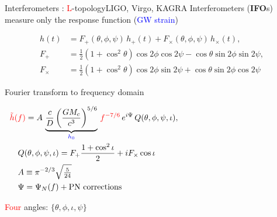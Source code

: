 \documentclass[xcolor=dvipsnames,handout,t]{beamer}
\newcommand{\red}[1]{\textcolor{red}{#1}}
\newcommand{\bl}[1]{\textcolor{blue}{#1}}
\newcommand{\f}{\frac}
\begin{document}
\begin{frame}{Interferometers : \red{L}-topology}{LIGO, Virgo, KAGRA}
  \vspace{-2mm}
  Interferometers ({\bf IFO}s) measure only the response function (\bl{GW strain})
  \begin{footnotesize}
  \begin{align*}
   h(t) &= F_+(\theta,\phi,\psi) \,h_+(t)+F_\times(\theta,\phi,\psi)\, h_\times(t) , \\
    F_+ &=\f{1}{2}\left(1+\cos^2\theta\right)\cos2\phi\cos 2\psi-\cos\theta \sin2\phi \sin2\psi, \\
    F_\times &=\f{1}{2}\left(1+\cos^2\theta\right)\cos2\phi\sin2\psi+\cos\theta \sin2\phi \cos2\psi
   \end{align*}
   \end{footnotesize}
   {
      Fourier transform to frequency domain 
      \begin{footnotesize}
      \begin{align*}
      &\red{\tilde{h}(f)} =A\, \underbrace{\f{c}{D}\left(\f{G M_c}{c^3}\right)^{5/6}}_{\bl{h_0}} \,\red{f^{-7/6}}\, e^{i\Psi}\, Q(\theta,\phi,\psi,\iota),\hspace{5cm} \\
	&\quad Q(\theta,\phi,\psi,\iota) = F_+\f{1+\cos^2\iota}{2}  + i F_\times \cos\iota \\
      &\quad A\equiv \pi^{-2/3}\sqrt{\tfrac{5}{24}}\\
      &\quad \Psi = \Psi_N(f) + \text{PN corrections}
	\end{align*}
	\end{footnotesize}
    }
    {
      \red{Four} angles: $\{\theta,\phi,\iota,\psi \}$
    }   
\end{frame}
\end{document}
